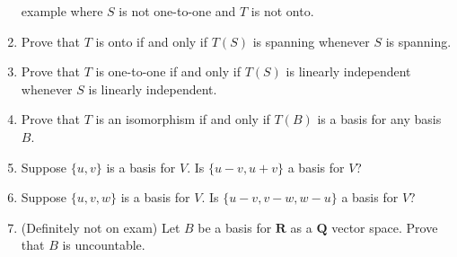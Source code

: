 \documentclass{article}
\begin{document}
\begin{enumerate}
        example where $S$ is not one-to-one and $T$ is not onto.
    \item
        Prove that $T$ is onto if and only if $T(S)$ is spanning whenever $S$
        is spanning.
    \item
        Prove that $T$ is one-to-one if and only if $T(S)$ is linearly
        independent whenever $S$ is linearly independent.
    \item
        Prove that $T$ is an isomorphism if and only if $T(B)$ is a basis for
        any basis $B$.
    \item
        Suppose $\{u,v\}$ is a basis for $V$. Is $\{u-v,u+v\}$
        a basis for $V$?
    \item
        Suppose $\{u,v,w\}$ is a basis for $V$. Is $\{u-v,v-w,w-u\}$ a basis
        for $V$?
    \item
        (Definitely not on exam) Let $B$ be a basis for $\mathbf{R}$ as a
        $\mathbf{Q}$ vector space. Prove that $B$ is uncountable.
\end{enumerate}
\end{document}

